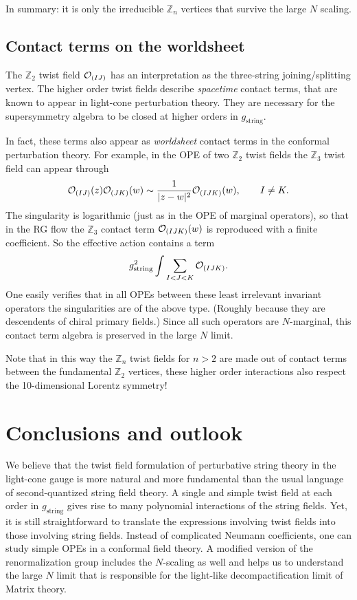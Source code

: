 \documentclass[nohyper,12pt,letterpaper]{JHEP3}
\def\IZ{{\mathbb Z}}           %
\def\calO{{\cal O}}
\def \eqn#1#2{\begin{equation}#2\label{#1}\end{equation}}
\def \gs{g_{\mathrm{string}}}
\begin{document}
In summary: it is only the irreducible $\IZ_n$ vertices that survive the 
large $N$ scaling.


\subsection{Contact terms on the worldsheet}

The $\IZ_2$ twist field $\calO_{(IJ)}$ has an interpretation as the 
three-string joining/splitting vertex. The higher order twist fields 
describe {\it spacetime} contact terms, that are known to appear in 
light-cone  perturbation theory. They are necessary for the supersymmetry 
algebra to be closed at higher orders in $\gs$.

In fact, these terms also appear as {\it worldsheet} contact terms in the 
conformal perturbation theory. For example, in the OPE of two $\IZ_2$ 
twist fields the $\IZ_3$ twist field can appear through
\eqn{zthreeappear}{\calO_{(IJ)}(z)
\calO_{(JK)}(w)\sim\frac{1}{|z-w|^2}\calO_{(IJK)}(w),
\qquad I\neq K.}
The singularity is logarithmic (just as in the OPE of marginal operators), 
so that in the RG flow the $\IZ_3$ contact term $\calO_{(IJK)}(w)$ is 
reproduced with a finite coefficient. So the effective action contains a 
term
\eqn{efftri}{\gs^2 \int 
\sum_{I<J<K} \calO_{(IJK)}.}
One easily verifies that in all OPEs between these least irrelevant 
invariant operators the singularities  are of the above type. (Roughly 
because they are descendents of chiral primary fields.) Since all such
operators are $N$-marginal, this contact term algebra is preserved in the 
large $N$ limit. 

Note that in this way the $\IZ_n$ twist fields for $n>2$ are made out of 
contact terms between the fundamental $\IZ_2$ vertices, these higher order 
interactions also respect the 10-dimensional Lorentz symmetry!


\section{Conclusions and outlook}

We believe that the twist field formulation of perturbative string theory 
in the light-cone gauge is more natural and more fundamental
than the usual language of second-quantized string field theory. A single 
and simple twist field at each order in $\gs$ gives rise to many 
polynomial interactions of the string fields. 
Yet, it is still straightforward to translate the expressions involving
twist fields into those involving string fields.
Instead of complicated 
Neumann coefficients, one can study simple OPEs in a conformal field 
theory. A modified version of the renormalization group includes the 
$N$-scaling as well and helps us to understand the large $N$ limit that is 
responsible for the light-like decompactification limit of Matrix theory.
\end{document}
